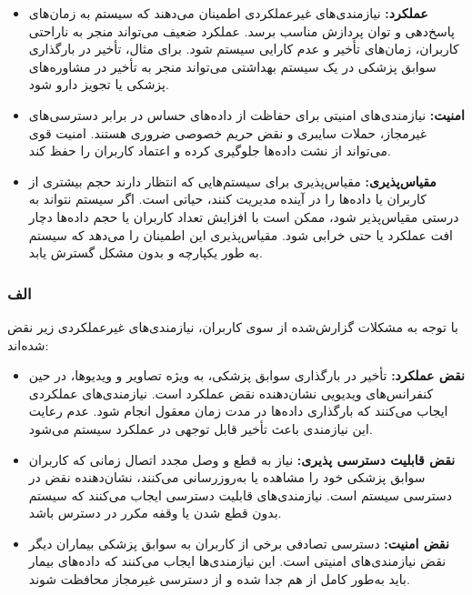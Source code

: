 \begin{itemize}
    \item \textbf{عملکرد:} نیازمندی‌های غیرعملکردی اطمینان می‌دهند که سیستم به زمان‌های پاسخ‌دهی و توان پردازش مناسب برسد. عملکرد ضعیف می‌تواند منجر به ناراحتی کاربران، زمان‌های تأخیر و عدم کارایی سیستم شود. برای مثال، تأخیر در بارگذاری سوابق پزشکی در یک سیستم بهداشتی می‌تواند منجر به تأخیر در مشاوره‌های پزشکی یا تجویز دارو شود.
    \item \textbf{امنیت:} نیازمندی‌های امنیتی برای حفاظت از داده‌های حساس در برابر دسترسی‌های غیرمجاز، حملات سایبری و نقض حریم خصوصی ضروری هستند. امنیت قوی می‌تواند از نشت داده‌ها جلوگیری کرده و اعتماد کاربران را حفظ کند.
    \item \textbf{مقیاس‌پذیری:} مقیاس‌پذیری برای سیستم‌هایی که انتظار دارند حجم بیشتری از کاربران یا داده‌ها را در آینده مدیریت کنند، حیاتی است. اگر سیستم نتواند به درستی مقیاس‌پذیر شود، ممکن است با افزایش تعداد کاربران یا حجم داده‌ها دچار افت عملکرد یا حتی خرابی شود. مقیاس‌پذیری این اطمینان را می‌دهد که سیستم به طور یکپارچه و بدون مشکل گسترش یابد.
\end{itemize}



\subsubsection*{الف}

با توجه به مشکلات گزارش‌شده از سوی کاربران، نیازمندی‌های غیرعملکردی زیر نقض شده‌اند:

\begin{itemize}
    \item \textbf{نقض عملکرد:} تأخیر در بارگذاری سوابق پزشکی، به ویژه تصاویر و ویدیوها، در حین کنفرانس‌های ویدیویی نشان‌دهنده نقض عملکرد است. نیازمندی‌های عملکردی ایجاب می‌کنند که بارگذاری داده‌ها در مدت زمان معقول انجام شود. عدم رعایت این نیازمندی باعث تأخیر قابل توجهی در عملکرد سیستم می‌شود.
    \item \textbf{نقض قابلیت دسترسی پذیری:} نیاز به قطع و وصل مجدد اتصال زمانی که کاربران سوابق پزشکی خود را مشاهده یا به‌روزرسانی می‌کنند، نشان‌دهنده نقض در دسترسی سیستم است. نیازمندی‌های قابلیت دسترسی ایجاب می‌کنند که سیستم بدون قطع شدن یا وقفه مکرر در دسترس باشد.
    \item \textbf{نقض امنیت:} دسترسی تصادفی برخی از کاربران به سوابق پزشکی بیماران دیگر نقض نیازمندی‌های امنیتی است. این نیازمندی‌ها ایجاب می‌کنند که داده‌های بیمار باید به‌طور کامل از هم جدا شده و از دسترسی غیرمجاز محافظت شوند.
\end{itemize}

